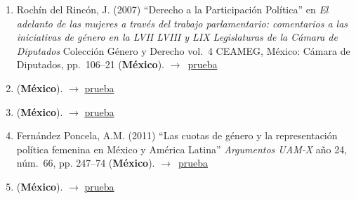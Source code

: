 \documentclass[12 pt, letter]{article}
\newenvironment{CitasMiTrabajo}{
    \begin{footnotesize}
    \begin{enumerate}[label={\footnotesize\emph{cita~\arabic*}},ref=\arabic*] %
        \setlength{\itemsep}{.1\itemsep}
        \setlength{\parskip}{.1\parskip}
    }{\end{enumerate}\end{footnotesize}}
\begin{document}
        \begin{CitasMiTrabajo}

        \item Roch\'in del Rinc\'on, J. (2007)
        ``Derecho a la Participaci\'on Pol\'itica''
        en \emph{El adelanto de las mujeres a trav\'es del trabajo parlamentario:
        comentarios a las iniciativas de g\'enero en la LVII LVIII y LIX
        Legislaturas de la C\'amara de Diputados}
        Colecci\'on G\'enero y Derecho vol.\ 4 CEAMEG,
        M\'exico: C\'amara de Diputados, pp.\ 106--21 (\textbf{M\'exico}). $\rightarrow$~\href{https://github.com/emagar/cv/blob/master/citasMiTrab/huertaMagar/cdip.pdf}{prueba}

        \item {} (\textbf{M\'exico}). $\rightarrow$ \href{https://github.com/emagar/cv/blob/master/citasMiTrab/huertaMagar/gonzalezMarin2008.pdf}{prueba}

        \item {} (\textbf{M\'exico}). $\rightarrow$ \href{https://github.com/emagar/cv/blob/master/citasMiTrab/huertaMagar/arroyo.etal2008.pdf}{prueba}

        \item Fern\'andez Poncela, A.M. (2011) ``Las cuotas de g\'enero y la representaci\'on pol\'itica femenina en M\'exico y Am\'erica Latina''
            \emph{Argumentos UAM-X} a\~no 24, n\'um.\ 66, pp. 247--74 (\textbf{M\'exico}). $\rightarrow$~\href{https://github.com/emagar/cv/blob/master/citasMiTrab/huertaMagar/fdzPoncela2011.pdf}{prueba}

        \item {} (\textbf{M\'exico}). $\rightarrow$ \href{https://github.com/emagar/cv/blob/master/citasMiTrab/huertaMagar/martinez.garridoRepresentacionDescSustMx2013rms.pdf}{prueba}

        \label{ncites:magar.huerta.2006} %

        \end{CitasMiTrabajo}





\end{document}

